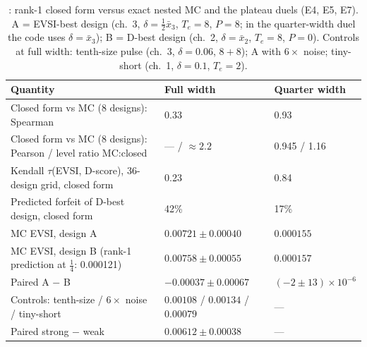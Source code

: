 \begin{table}[htbp]
\centering\footnotesize
\caption{: rank-1 closed form versus exact nested MC and the plateau duels (E4, E5, E7). A = EVSI-best design (ch.\ 3, $\delta = \tfrac12\bar x_3$, $T_e = 8$, $P = 8$; in the quarter-width duel the code uses $\delta = \bar x_3$); B = D-best design (ch.\ 2, $\delta = \bar x_2$, $T_e = 8$, $P = 0$). Controls at full width: tenth-size pulse (ch.\ 3, $\delta = 0.06$, $8{+}8$); A with $6\times$ noise; tiny-short (ch.\ 1, $\delta = 0.1$, $T_e = 2$).}
\label{voi:tab:duel}
\begin{tabular}{lll}
\toprule
Quantity & Full width & Quarter width \\
\midrule
Closed form vs MC (8 designs): Spearman & 0.33 & 0.93 \\
Closed form vs MC (8 designs): Pearson / level ratio MC:closed & --- / $\approx 2.2$ & 0.945 / 1.16 \\
Kendall $\tau$(EVSI, D-score), 36-design grid, closed form & 0.23 & 0.84 \\
Predicted forfeit of D-best design, closed form & 42\% & 17\% \\
MC EVSI, design A & $0.00721 \pm 0.00040$ & $0.000155$ \\
MC EVSI, design B (rank-1 prediction at $\tfrac14$: 0.000121) & $0.00758 \pm 0.00055$ & $0.000157$ \\
Paired A $-$ B & $-0.00037 \pm 0.00067$ & $(-2 \pm 13)\times10^{-6}$ \\
Controls: tenth-size / $6\times$ noise / tiny-short & $0.00108$ / $0.00134$ / $0.00079$ & --- \\
Paired strong $-$ weak & $0.00612 \pm 0.00038$ & --- \\
\bottomrule
\end{tabular}
\end{table}

